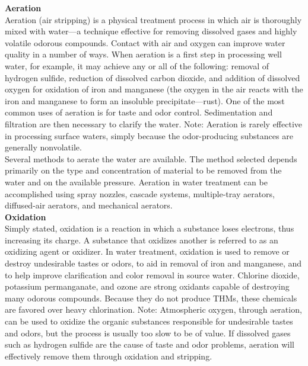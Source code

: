 \documentclass{article}
\begin{document}
\textbf{Aeration}\\
Aeration (air stripping) is a physical treatment process in which air is thoroughly mixed with water—a technique effective for removing dissolved gases and highly volatile odorous compounds. Contact with air and oxygen can improve water quality in a number of ways. When aeration is a first step in processing well water, for example, it may achieve any or all of the following: removal of hydrogen sulfide, reduction of dissolved carbon dioxide, and addition of dissolved oxygen for oxidation of iron and manganese (the oxygen in the air reacts with the iron and manganese to form an insoluble precipitate—rust). One of the most common uses of aeration is for taste and odor control. Sedimentation and filtration are then necessary to clarify the water.
Note: Aeration is rarely effective in processing surface waters, simply because the odor-producing substances are generally nonvolatile.\\
Several methods to aerate the water are available. The method selected depends primarily on the type and concentration of material to be removed from the water and on the available pressure. Aeration in water treatment can be accomplished using spray nozzles, cascade systems, multiple-tray aerators, diffused-air aerators, and mechanical aerators.\\


\textbf{Oxidation}\\
Simply stated, oxidation is a reaction in which a substance loses electrons, thus increasing its charge. A substance that oxidizes another is referred to as an oxidizing agent or oxidizer. In water treatment, oxidation is used to remove or destroy undesirable tastes or odors, to aid in removal of iron and manganese, and to help improve clarification and color removal in source water. Chlorine dioxide, potassium permanganate, and ozone are strong oxidants capable of destroying many odorous compounds. Because they do not produce THMs, these chemicals are favored over heavy chlorination.
Note: Atmospheric oxygen, through aeration, can be used to oxidize the organic substances responsible for undesirable tastes and odors, but the process is usually too slow to be of value. If dissolved gases such as hydrogen sulfide are the cause of taste and odor problems, aeration will effectively remove them through oxidation and stripping.
\end{document}

